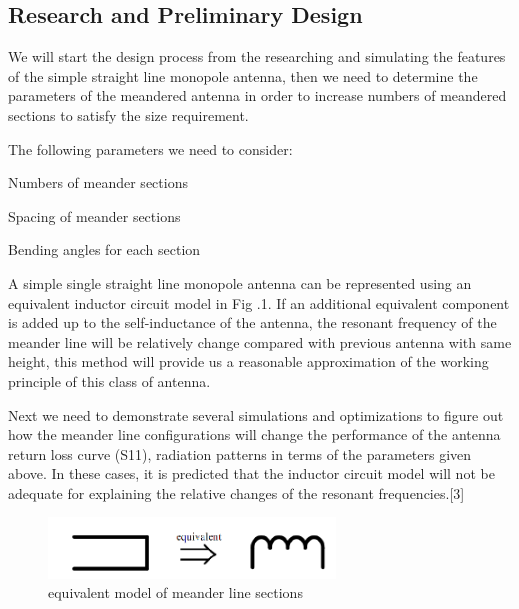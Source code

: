 \subsection{Research and Preliminary Design}

We will start the design process from the researching and simulating the features of the simple straight line monopole antenna, then we need to determine the parameters of the meandered antenna in order to increase numbers of meandered sections to satisfy the size requirement.

The following parameters we need to consider:

\begin{itemize*}

  \item Numbers of meander sections
  \item Spacing of meander sections
  \item Bending angles for each section

\end{itemize*}

A simple single straight line monopole antenna can be represented using an equivalent inductor circuit model in Fig .1. If an additional equivalent component is added up to the self-inductance of the antenna, the resonant frequency of the meander line will be relatively change compared with previous antenna with same height, this method will provide us a reasonable approximation of the working principle of this class of antenna.

Next we need to demonstrate several simulations and optimizations to figure out how the meander line configurations will change the performance of the antenna return loss curve (S11), radiation patterns in terms of the parameters given above. In these cases, it is predicted that the inductor circuit model will not be adequate for explaining the relative changes of the resonant frequencies.[3]

\begin{figure}[h]
	\begin{center}
		\includegraphics[width=3in]{./images/efield_image1.png}
		\caption{equivalent model of meander line sections}
		\label{fig:efield_fig1}
	\end{center}
\end{figure}


